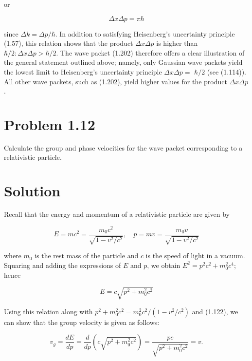 \documentclass[10pt]{article}
\begin{document}
or


\begin{equation*}
\Delta x \Delta p=\pi \hbar \tag{1.205}
\end{equation*}


since $\Delta k=\Delta p / \hbar$. In addition to satisfying Heisenberg's uncertainty principle (1.57), this relation shows that the product $\Delta x \Delta p$ is higher than $\hbar / 2: \Delta x \Delta p>\hbar / 2$. The wave packet (1.202) therefore offers a clear illustration of the general statement outlined above; namely, only Gaussian wave packets yield the lowest limit to Heisenberg's uncertainty principle $\Delta x \Delta p=$ $\hbar / 2$ (see (1.114)). All other wave packets, such as (1.202), yield higher values for the product $\Delta x \Delta p$.

\section*{Problem 1.12}
Calculate the group and phase velocities for the wave packet corresponding to a relativistic particle.

\section*{Solution}
Recall that the energy and momentum of a relativistic particle are given by


\begin{equation*}
E=m c^{2}=\frac{m_{0} c^{2}}{\sqrt{1-v^{2} / c^{2}}}, \quad p=m v=\frac{m_{0} v}{\sqrt{1-v^{2} / c^{2}}} \tag{1.206}
\end{equation*}


where $m_{0}$ is the rest mass of the particle and $c$ is the speed of light in a vacuum. Squaring and adding the expressions of $E$ and $p$, we obtain $E^{2}=p^{2} c^{2}+m_{0}^{2} c^{4}$; hence


\begin{equation*}
E=c \sqrt{p^{2}+m_{0}^{2} c^{2}} \tag{1.207}
\end{equation*}


Using this relation along with $p^{2}+m_{0}^{2} c^{2}=m_{0}^{2} c^{2} /\left(1-v^{2} / c^{2}\right)$ and (1.122), we can show that the group velocity is given as follows:


\begin{equation*}
v_{g}=\frac{d E}{d p}=\frac{d}{d p}\left(c \sqrt{p^{2}+m_{0}^{2} c^{2}}\right)=\frac{p c}{\sqrt{p^{2}+m_{0}^{2} c^{2}}}=v . \tag{1.208}
\end{equation*}
\end{document}
